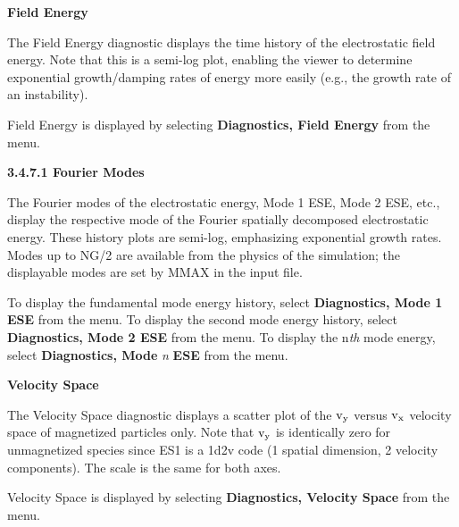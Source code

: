 \begin{section}
\begin{subsection}
\begin{subsubsection}
{\bf Field Energy}

      The Field Energy diagnostic displays the time history of the
      electrostatic field energy.  Note that this is a semi-log plot, enabling
      the viewer to determine exponential growth/damping rates of energy more
      easily (e.g., the growth rate of an instability).
\vspace{.2in}

\noindent
      Field Energy is displayed by selecting 
	{\bf Diagnostics, Field Energy} from the menu.

\vspace{.2in}

\noindent
{\bf 3.4.7.1 Fourier Modes} 		\\

\vspace{.1in}

\noindent
The Fourier modes of the electrostatic energy, Mode 1 ESE, Mode 2 ESE,
etc., display the respective mode of the Fourier spatially decomposed
electrostatic energy.  These history plots are semi-log, emphasizing
exponential growth rates.  Modes up to NG/2 are available from the
physics of the simulation; the displayable modes are set by MMAX in
the input file.
\vspace{.2in}

\noindent
         To display the fundamental mode energy history, select 
	 {\bf Diagnostics, Mode 1 ESE} from the menu.  To display the 
	 second mode energy history, select {\bf Diagnostics, Mode 2 ESE}
  	 from the menu.  To display the n{\em th} mode
         energy, select {\bf Diagnostics, Mode} {\em n} {\bf ESE} from the menu.
\end{subsubsection}

\begin{subsubsection}
{\bf Velocity Space}

      The Velocity Space diagnostic displays a scatter plot of the
${\rm v_{y}}$ versus ${\rm v_{x}}$
      velocity space of magnetized particles only.  Note that ${\rm v_{y}}$ is identically
      zero for unmagnetized species since ES1 is a 1d2v code (1 spatial
      dimension, 2 velocity components).  The scale is the same for both axes.
\vspace{.2in}

\noindent
      Velocity Space is displayed by selecting 
      {\bf Diagnostics, Velocity Space} from
      the menu.
\end{subsubsection}
\end{subsection}


\end{section}
